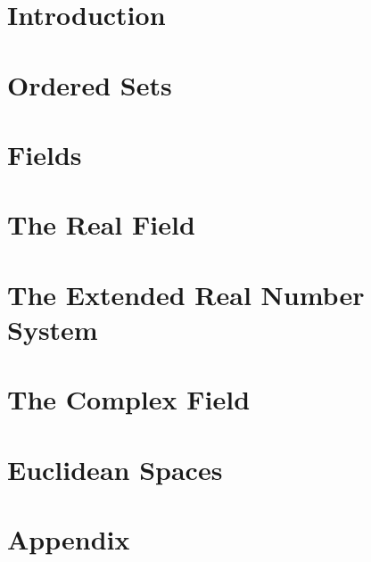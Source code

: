 \documentclass[../../templates/chapter]{subfiles}
\begin{document}
\section{Introduction}\label{sec:introduction}


\section{Ordered Sets}\label{sec:ordered-sets}


\section{Fields}\label{sec:fields}


\section{The Real Field}\label{sec:the-real-field}


\section{The Extended Real Number System}\label{sec:the-extended-real-number-system}


\section{The Complex Field}\label{sec:the-complex-field}


\section{Euclidean Spaces}\label{sec:euclidean-spaces}


\section{Appendix}\label{sec:appendix}

\end{document}
